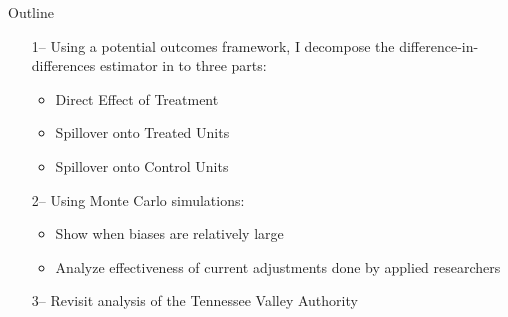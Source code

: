 \documentclass[aspectratio=43]{beamer}
\begin{document}




\begin{frame}{Outline}

    \begin{itemize}
        \item[1--] Using a potential outcomes framework, I decompose the difference-in-differences estimator in to three parts:
        \begin{itemize}
            \item Direct Effect of Treatment
            \item Spillover onto Treated Units
            \item Spillover onto Control Units
        \end{itemize} 
        
        \item[2--] Using Monte Carlo simulations:
        \begin{itemize}
            \item Show when biases are relatively large
            \item Analyze effectiveness of current adjustments done by applied researchers 
        \end{itemize}  

        \item[3--] Revisit \citet{Kline_Moretti_2014} analysis of the Tennessee Valley Authority
    \end{itemize} 
\end{frame}
\end{document}
